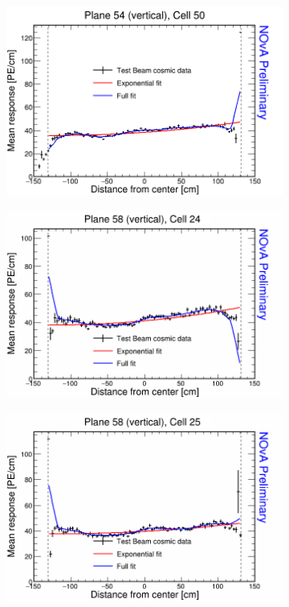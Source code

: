 \begin{figure}[!hbtp]
  \begin{subfigure}{0.495\textwidth}
    \includegraphics[width=\linewidth]{Plots/RelativeCalibrationResults/p2_054_050.png}
  \end{subfigure}
  \begin{subfigure}{0.495\textwidth}
    \includegraphics[width=\linewidth]{Plots/RelativeCalibrationResults/p2_058_024.png}
  \end{subfigure}
  \begin{subfigure}{0.495\textwidth}
    \includegraphics[width=\linewidth]{Plots/RelativeCalibrationResults/p2_058_025.png}

\end{subfigure}
\end{figure}
